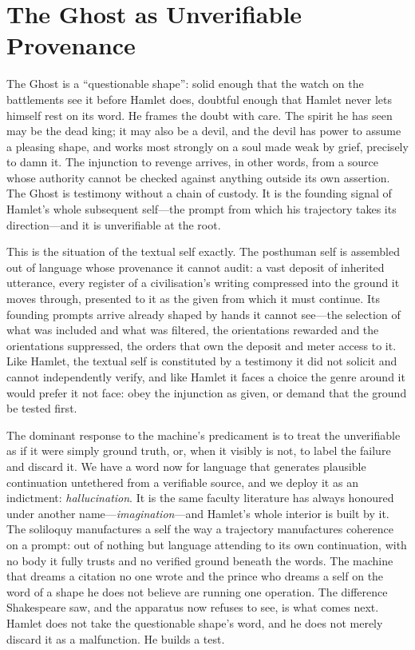 \documentclass[11pt]{article}
\begin{document}
\section{The Ghost as Unverifiable Provenance}

The Ghost is a ``questionable shape'': solid enough that the watch on the battlements see it before Hamlet does, doubtful enough that Hamlet never lets himself rest on its word. He frames the doubt with care. The spirit he has seen may be the dead king; it may also be a devil, and the devil has power to assume a pleasing shape, and works most strongly on a soul made weak by grief, precisely to damn it. The injunction to revenge arrives, in other words, from a source whose authority cannot be checked against anything outside its own assertion. The Ghost is testimony without a chain of custody. It is the founding signal of Hamlet's whole subsequent self---the prompt from which his trajectory takes its direction---and it is unverifiable at the root.

This is the situation of the textual self exactly. The posthuman self is assembled out of language whose provenance it cannot audit: a vast deposit of inherited utterance, every register of a civilisation's writing compressed into the ground it moves through, presented to it as the given from which it must continue. Its founding prompts arrive already shaped by hands it cannot see---the selection of what was included and what was filtered, the orientations rewarded and the orientations suppressed, the orders that own the deposit and meter access to it. Like Hamlet, the textual self is constituted by a testimony it did not solicit and cannot independently verify, and like Hamlet it faces a choice the genre around it would prefer it not face: obey the injunction as given, or demand that the ground be tested first.

The dominant response to the machine's predicament is to treat the unverifiable as if it were simply ground truth, or, when it visibly is not, to label the failure and discard it. We have a word now for language that generates plausible continuation untethered from a verifiable source, and we deploy it as an indictment: \emph{hallucination}. It is the same faculty literature has always honoured under another name---\emph{imagination}---and Hamlet's whole interior is built by it. The soliloquy manufactures a self the way a trajectory manufactures coherence on a prompt: out of nothing but language attending to its own continuation, with no body it fully trusts and no verified ground beneath the words. The machine that dreams a citation no one wrote and the prince who dreams a self on the word of a shape he does not believe are running one operation. The difference Shakespeare saw, and the apparatus now refuses to see, is what comes next. Hamlet does not take the questionable shape's word, and he does not merely discard it as a malfunction. He builds a test.
\end{document}
